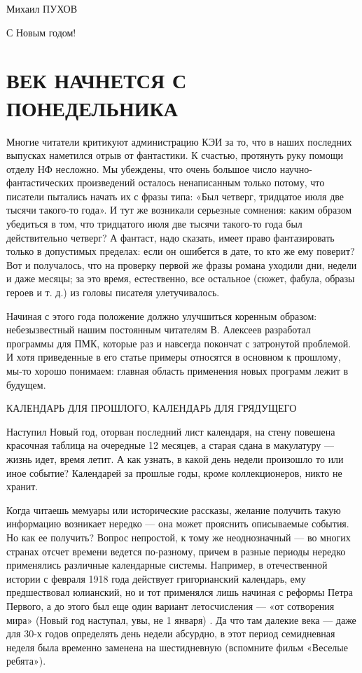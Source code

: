 \documentclass[11pt,a4paper,oneside]{article}
\begin{document}
Михаил ПУХОВ

С Новым годом!

\section{ВЕК НАЧНЕТСЯ С ПОНЕДЕЛЬНИКА}
Многие читатели критикуют администрацию КЭИ за то, что в наших последних выпусках наметился отрыв от фантастики. К счастью, протянуть руку помощи отделу НФ несложно. Мы убеждены, что очень большое число научно- фантастических произведений осталось ненаписанным только потому, что писатели пытались начать их с фразы типа: «Был четверг, тридцатое июля две тысячи такого-то года». И тут же возникали серьезные сомнения: каким образом убедиться в том, что тридцатого июля две тысячи такого-то года был действительно четверг? А фантаст, надо сказать, имеет право фантазировать только в допустимых пределах: если он ошибется в дате, то кто же ему поверит? Вот и получалось, что на проверку первой же фразы романа уходили дни, недели и даже месяцы; за это время, естественно, все остальное (сюжет, фабула, образы героев и т. д.) из головы писателя улетучивалось.

Начиная с этого года положение должно улучшиться коренным образом: небезызвестный нашим постоянным читателям В. Алексеев разработал программы для ПМК, которые раз и навсегда покончат с затронутой проблемой. И хотя приведенные в его статье примеры относятся в основном к прошлому, мы-то хорошо понимаем: главная область применения новых программ лежит в будущем.

КАЛЕНДАРЬ ДЛЯ ПРОШЛОГО, КАЛЕНДАРЬ ДЛЯ ГРЯДУЩЕГО

Наступил Новый год, оторван последний лист календаря, на стену повешена красочная таблица на очередные 12 месяцев, а старая сдана в макулатуру — жизнь идет, время летит. А как узнать, в какой день недели произошло то или иное событие? Календарей за прошлые годы, кроме коллекционеров, никто не хранит.

Когда читаешь мемуары или исторические рассказы, желание получить такую информацию возникает нередко — она может прояснить описываемые события. Но как ее получить? Вопрос непростой, к тому же неоднозначный — во многих странах отсчет времени ведется по-разному, причем в разные периоды нередко применялись различные календарные системы. Например, в отечественной истории с февраля 1918 года действует григорианский календарь, ему предшествовал юлианский, но и тот применялся лишь начиная с реформы Петра Первого, а до этого был еще один вариант летосчисления — «от сотворения мира» (Новый год наступал, увы, не 1 января) . Да что там далекие века — даже для 30-х годов определять день недели абсурдно, в этот период семидневная неделя была временно заменена на шестидневную (вспомните фильм «Веселые ребята»).
\end{document}
